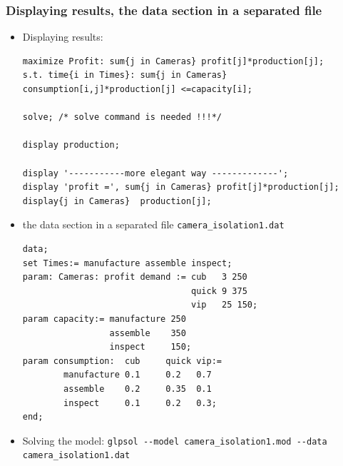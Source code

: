 \documentclass[landscape]{beamer}
\begin{document}
\begin{frame}[fragile]
  \frametitle{Displaying results, the data section in a separated file} 
  \vspace{-0.4cm}
\begin{tiny}  
\begin{itemize}  
\item Displaying results:\\  
\begin{tiny}
\begin{verbatim}
maximize Profit: sum{j in Cameras} profit[j]*production[j];
s.t. time{i in Times}: sum{j in Cameras} consumption[i,j]*production[j] <=capacity[i]; 

solve; /* solve command is needed !!!*/

display production;

display '-----------more elegant way -------------';
display 'profit =', sum{j in Cameras} profit[j]*production[j];
display{j in Cameras}  production[j];
\end{verbatim}
\end{tiny}
\item the data section in a separated file \verb=camera_isolation1.dat=
\begin{tiny}
\begin{verbatim}
data;
set Times:= manufacture assemble inspect;
param: Cameras: profit demand := cub   3 250
                                 quick 9 375
                                 vip   25 150;
param capacity:= manufacture 250
                 assemble    350
                 inspect     150;			
param consumption: 	cub 	quick vip:=
		manufacture	0.1     0.2   0.7   
		assemble	0.2     0.35  0.1
		inspect	    0.1     0.2   0.3;
end;
\end{verbatim}
\end{tiny}
\item Solving the model:
    \verb=glpsol --model camera_isolation1.mod --data camera_isolation1.dat=
\end{itemize}   
\end{tiny} 
\end{frame}
\end{document}
